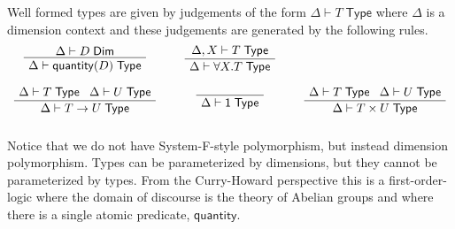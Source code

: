 \documentclass[a4paper,UKenglish]{lipics}
\newcommand{\msf}[1]{\mathsf{#1}} %
\newcommand{\num}{\msf{quantity}}
\newcommand{\Tj}[2]{#1 \vdash #2 \; \msf{ Type}}
\newcommand{\Dj}[2]{#1 \vdash #2 \; \msf{ Dim}}
\newcommand{\Dim}{D}
\newcommand{\Dvar}{X}
\begin{document}
Well formed types are given by judgements of the form $\Tj\Delta  T$ where
$\Delta$ is a dimension context and these judgements are generated by the following rules.
\[\begin{array}{ccc}
\AxiomC{$\Dj\Delta \Dim$}
		\UnaryInfC{$\Tj\Delta {\num(\Dim)}$}
		\DisplayProof

&\hspace{5mm}
\AxiomC{$\Tj {\Delta, \Dvar}  T$}
	\UnaryInfC{$\Tj \Delta{ \forall \Dvar.T} $}
	\DisplayProof
\\ \\
\AxiomC{$\Delta \vdash T \; \msf{ Type} \; \; \; \Delta \vdash U \; \msf{ Type}$}
	\UnaryInfC{$\Delta \vdash T \rightarrow U  \; \msf{ Type}$}
	\DisplayProof
&\hspace{5mm}
\AxiomC{ \;  }
		\UnaryInfC{$\Delta \vdash \msf{1} \; \msf{ Type}$}
	\DisplayProof
&\hspace{5mm}
\AxiomC{$\Delta \vdash T \; \msf{ Type} \; \; \; \Delta \vdash U \; \msf{ Type}$}
	\UnaryInfC{$\Delta \vdash T\times U \; \msf{ Type}$}
	\DisplayProof
\\ \\
\end{array}\]
Notice that we do not have System-F-style polymorphism, but instead dimension polymorphism. Types can be parameterized by dimensions, but they cannot be parameterized by types. From the Curry-Howard perspective this is a first-order-logic where the domain of discourse is the theory of Abelian groups
and where there is a single atomic predicate, $\num$.
\end{document}
